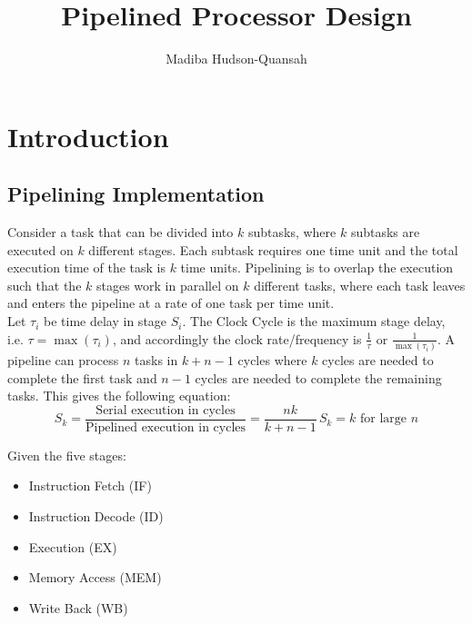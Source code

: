 \documentclass[12pt letter]{report}
\title{\Huge{Pipelined Processor Design}}
\author{\huge{Madiba Hudson-Quansah}}
\date{}
\begin{document}
\maketitle
\newpage
{}
\tableofcontents
\pagebreak

\chapter{Introduction}


\section{Pipelining Implementation}

Consider a task that can be divided into $k$ subtasks, where $k$ subtasks are executed on $k$ different stages. Each subtask requires one time unit and the total
execution time of the task is $k$ time units. Pipelining is to overlap the execution such that the $k$ stages work in parallel on $k$ different tasks, where each
task leaves and enters the pipeline at a rate of one task per time unit. \\


Let $ \tau_i$ be time delay in stage $S_i$. The Clock Cycle is the maximum stage delay, i.e. $ \tau = \max \left( \tau_i \right) $, and accordingly
the clock rate/frequency is $\frac{1}{\tau}$ or $\frac{1}{\max \left( \tau_i \right) }$. A pipeline can process $n$ tasks in $k + n - 1$ cycles where
$k$ cycles are needed to complete the first task and $n - 1$ cycles are needed to complete the remaining tasks. This gives the following equation:
\[
  S_k = \frac{\text{Serial execution in cycles}}{\text{Pipelined execution in cycles}} = \frac{nk}{k + n - 1}\, S_k = k \text{ for large } n
\]

Given the five stages:
\begin{itemize}
  \item Instruction Fetch (IF)
  \item Instruction Decode (ID)
  \item Execution (EX)
  \item Memory Access (MEM)
  \item Write Back (WB)
\end{itemize}
\end{document}

